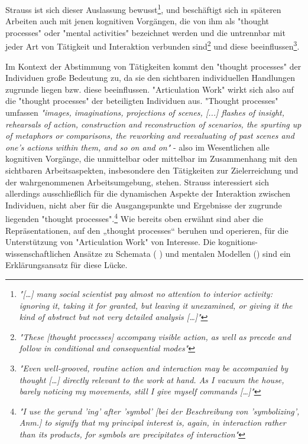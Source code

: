 Strauss ist sich dieser Auslassung bewusst\footnote{\emph{"[\ldots] many social scientist pay almost no attention to interior activity: ignoring it, taking it for granted, but leaving it unexamined, or giving it the kind of abstract but not very detailed analysis [\ldots]"}\citep[][S. 131]{Strauss93}}, und beschäftigt sich in späteren Arbeiten \citep{Strauss93} auch mit jenen kognitiven Vorgängen, die von ihm als "thought processes" oder "mental activities" bezeichnet werden und die untrennbar mit jeder Art von Tätigkeit und Interaktion verbunden sind\footnote{\emph{"These [thought processes] accompany visible action, as well as precede and follow in conditional and consequential modes"}\citep[][S. 146]{Strauss93}} und diese beeinflussen\footnote{\emph{"Even well-grooved, routine action and interaction may be accompanied by thought [\ldots] directly relevant to the work at hand. As I vacuum the house, barely noticing my movements, still I give myself commands [\ldots]"}\citep[][S. 132]{Strauss93}}. 

Im Kontext der Abstimmung von Tätigkeiten kommt den "thought processes" der Individuen große Bedeutung zu, da sie den sichtbaren individuellen Handlungen zugrunde liegen bzw. diese beeinflussen. "Articulation Work" wirkt sich also auf die "thought processes" der beteiligten Individuen aus. "Thought processes" umfassen \emph{"images, imaginations, projections of scenes, [...] flashes of insight, rehearsals of action, construction and reconstruction of scenarios, the spurting up of metaphors or comparisons, the reworking and reevaluating of past scenes and one's actions within them, and so on and on"} \citep[][S. 130]{Strauss93} - also im Wesentlichen alle kognitiven Vorgänge, die unmittelbar oder mittelbar im Zusammenhang mit den sichtbaren Arbeitsaspekten, insbesondere den Tätigkeiten zur Zielerreichung und der wahrgenommenen Arbeitsumgebung, stehen. Strauss interessiert sich allerdings ausschließlich für die dynamischen Aspekte der Interaktion zwischen Individuen, nicht aber für die Ausgangspunkte und Ergebnisse der zugrunde liegenden "thought processes".\footnote{\emph{"I use the gerund 'ing' after 'symbol' [bei der Beschreibung von 'symbolizing', Anm.] to signify that my principal interest is, again, in interaction rather than its products, for symbols are precipitates of interaction"}\citep[][S. 149]{Strauss93}}  Wie bereits oben erwähnt sind aber die Repräsentationen, auf den „thought processes“ beruhen und operieren, für die Unterstützung von "Articulation Work" von Interesse. Die kognitions-wissenschaftlichen Ansätze zu Schemata (\citet{Rumelhart78} \citet[vgl. nach ]{Hanke06}) und mentalen Modellen (\citet[vgl. ]{Seel91}) sind ein Erklärungsansatz für diese Lücke.


